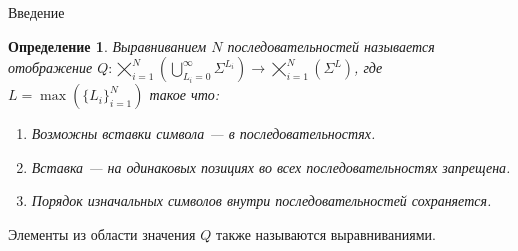 \documentclass[ucs, notheorems, handout, 10pt]{beamer}
\newtheorem{defenition}{Определение}
\begin{document}
	\setcounter{framenumber}{1}
	\begin{frame}{Введение}
		\begin{defenition}
			Выравниванием $N$ последовательностей называется отображение $Q: \bigtimes_{i=1}^{N}(\bigcup_{L_i=0}^{\infty} \Sigma^{L_i}) \rightarrow \bigtimes_{i=1}^{N}(\Sigma^{L})$, где $L = \max(\{L_i\}_{i=1}^{N})$ такое что:
			\begin{enumerate}
				\item Возможны вставки символа --- в последовательностях.
				\item Вставка --- на одинаковых позициях во всех последовательностях запрещена.
				\item Порядок изначальных символов внутри последовательностей сохраняется.
			\end{enumerate}
		\end{defenition}
		
		Элементы из области значения $Q$ также называются выравниваниями.
		
	\end{frame}
\end{document}
